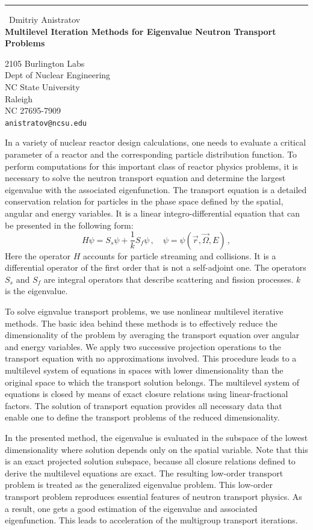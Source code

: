 \documentclass{report}
\begin{document}
\begin{center}
\rule{6in}{1pt} \
{\large Dmitriy Anistratov \\
{\bf Multilevel Iteration Methods for Eigenvalue Neutron Transport Problems}}

2105 Burlington Labs \\ Dept of Nuclear Engineering \\ NC State University \\ Raleigh \\ NC 27695-7909
\\
{\tt anistratov@ncsu.edu}\end{center}

In a variety of nuclear reactor design calculations, one needs to
evaluate a critical parameter of a reactor and the corresponding particle
distribution function. To perform computations for this important class
of reactor physics problems, it is necessary to solve the neutron
transport equation and determine the largest eigenvalue with the
associated eigenfunction. The transport equation is a detailed
conservation relation for particles in the phase space defined by the
spatial, angular and energy variables. It is a linear
integro-differential equation that can be presented in the following
form:
\[
H\psi=S_s\psi+ \frac{1}{k}S_f\psi \, , \quad \psi=\psi(\vec r, \vec \Omega, E) \, ,
\]
Here the operator $H$ accounts for particle streaming and collisions. It
is a differential operator of the first order that is not a self-adjoint
one. The operators $S_s$ and $S_f$ are integral operators that describe
scattering and fission processes. $k$ is the eigenvalue.


To solve eignvalue transport problems, we use nonlinear multilevel
iterative methods. The basic idea behind these methods is to effectively
reduce the dimensionality of the problem by averaging the transport
equation over angular and energy variables. We apply two successive
projection operations to the transport equation with no approximations
involved. This procedure leads to a multilevel system of equations in
spaces with lower dimensionality than the original space to which the
transport solution belongs. The multilevel system of equations is closed
by means of exact closure relations using linear-fractional factors. The
solution of transport equation provides all necessary data that enable
one to define the transport problems of the reduced dimensionality.


In the presented method, the eigenvalue is evaluated in the subspace of
the lowest dimensionality where solution depends only on the spatial
variable. Note that this is an exact projected solution subspace, because
all closure relations defined to derive the multilevel equations are
exact. The resulting low-order transport problem is treated as the
generalized eigenvalue problem. This low-order transport problem
reproduces essential features of neutron transport physics. As a result,
one gets a good estimation of the eigenvalue and associated
eigenfunction. This leads to acceleration of the multigroup transport
iterations.
\end{document}
